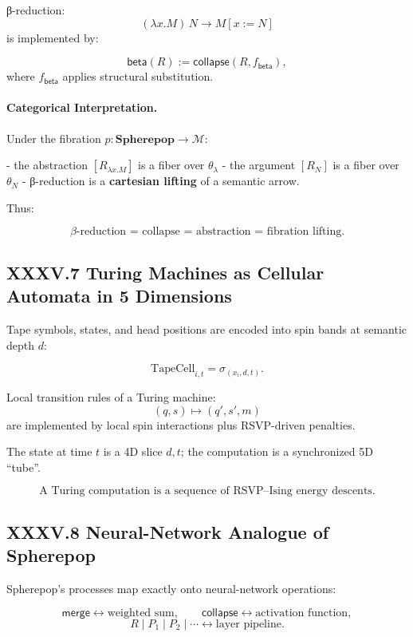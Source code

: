 \documentclass[12pt,letterpaper]{article}
\begin{document}
β-reduction:
\[
(\lambda x.M)\,N \to M[x:=N]
\]
is implemented by:

\[
\mathsf{beta}(R) 
:= 
\mathsf{collapse}(R, f_{\mathsf{beta}}),
\]
where $f_{\mathsf{beta}}$ applies structural substitution.

\paragraph{Categorical Interpretation.}  
Under the fibration $p : \mathbf{Spherepop} \to \mathcal{M}$:

- the abstraction $[R_{\lambda x.M}]$ is a fiber over $\theta_{\lambda}$  
- the argument $[R_N]$ is a fiber over $\theta_N$  
- β-reduction is a \textbf{cartesian lifting} of a semantic arrow.

Thus:

\[
\boxed{
\beta\text{-reduction = collapse = abstraction = fibration lifting}.
}
\]

\subsection{XXXV.7 Turing Machines as Cellular Automata in 5 Dimensions}

Tape symbols, states, and head positions are encoded into spin bands 
at semantic depth $d$:

\[
\text{TapeCell}_{i,t} = \sigma_{(x_i,d,t)}.
\]

Local transition rules of a Turing machine:
\[
(q, s) \mapsto (q',s',m)
\]
are implemented by local spin interactions plus RSVP-driven penalties.

The state at time $t$ is a 4D slice $d,t$;  
the computation is a synchronized 5D ``tube''.

\[
\boxed{
\text{A Turing computation is a sequence of RSVP--Ising energy descents.}
}
\]

\subsection{XXXV.8 Neural-Network Analogue of Spherepop}

Spherepop's processes map exactly onto neural-network operations:

\[
\mathsf{merge} \longleftrightarrow \text{weighted sum},\qquad
\mathsf{collapse} \longleftrightarrow \text{activation function},
\]
\[
R \mid P_1 \mid P_2 \mid \cdots \longleftrightarrow \text{layer pipeline}.
\]
\end{document}
